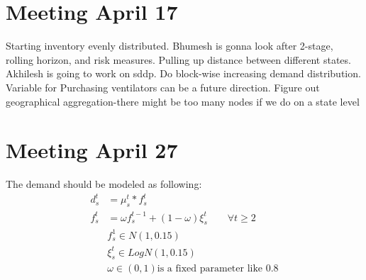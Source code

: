 \documentclass[11pt,letterpaper]{article}
\begin{document}
\section*{Meeting April 17}
Starting inventory evenly distributed. 
Bhumesh is gonna look after 2-stage, rolling horizon, and risk measures. Pulling up distance between different states.
Akhilesh is going to work on sddp. Do block-wise increasing demand distribution.
Variable for Purchasing ventilators can be a future direction.
Figure out geographical aggregation-there might be too many nodes if we do on a state level
\section*{Meeting April 27}
The demand should be modeled as following:
\begin{align}
d^t_{s}&=\mu^{t}_{s}*f^t_s\\
f^t_s&=\omega f^{t-1}_s+(1-\omega)\xi^t_s \qquad \forall t\ge 2\\
&f^1_s\in N(1,0.15)\\
&\xi^t_s\in LogN(1,0.15)\\
&\omega\in (0,1) \text{is a fixed parameter like 0.8}
\end{align}
\end{document}
